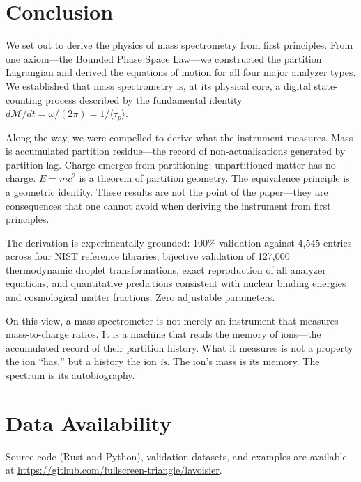 \documentclass[twocolumn,10pt,a4paper]{article}
\theoremstyle{definition}
\theoremstyle{remark}
\newcommand{\Depth}{\mathcal{M}}
\newcommand{\taup}{\tau_p}
\begin{document}
\section{Conclusion}
\label{sec:conclusion}

We set out to derive the physics of mass spectrometry from first principles. From one axiom---the Bounded Phase Space Law---we constructed the partition Lagrangian and derived the equations of motion for all four major analyzer types. We established that mass spectrometry is, at its physical core, a digital state-counting process described by the fundamental identity $d\Depth/dt = \omega/(2\pi) = 1/\langle\taup\rangle$.

Along the way, we were compelled to derive what the instrument measures. Mass is accumulated partition residue---the record of non-actualisations generated by partition lag. Charge emerges from partitioning; unpartitioned matter has no charge. $E = mc^2$ is a theorem of partition geometry. The equivalence principle is a geometric identity. These results are not the point of the paper---they are consequences that one cannot avoid when deriving the instrument from first principles.

The derivation is experimentally grounded: 100\% validation against 4,545 entries across four NIST reference libraries, bijective validation of 127,000 thermodynamic droplet transformations, exact reproduction of all analyzer equations, and quantitative predictions consistent with nuclear binding energies and cosmological matter fractions. Zero adjustable parameters.

On this view, a mass spectrometer is not merely an instrument that measures mass-to-charge ratios. It is a machine that reads the memory of ions---the accumulated record of their partition history. What it measures is not a property the ion ``has,'' but a history the ion \emph{is}. The ion's mass is its memory. The spectrum is its autobiography.

\section*{Data Availability}

Source code (Rust and Python), validation datasets, and examples are available at \url{https://github.com/fullscreen-triangle/lavoisier}.



\end{document}
